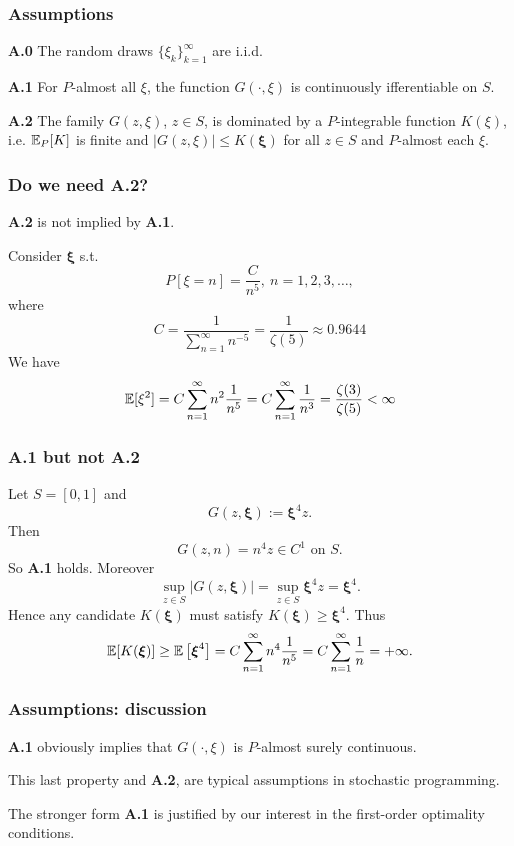 \documentclass{beamer}
\def\bxi{\boldsymbol\xi}
\begin{document}
\begin{frame}
\frametitle{Assumptions}

\noindent
\textbf{A.0}
The random draws $\lbrace \xi_k \rbrace_{k= 1}^{\infty}$ are i.i.d.

\mbox{}

\noindent
\textbf{A.1}
For $P$-almost all $\xi$, the function $G(\cdot, \xi)$ is continuously ifferentiable on $S$.

\mbox{}

\noindent
\textbf{A.2}
The family $G(z, \xi)$, $z \in S$, is dominated by a $P$-integrable function $K(\xi)$, i.e. ${\mathbb{E}}_P[K]$ is finite and $| G(z, \xi) | \leq K(\bxi)$ for all $z \in S$ and $P$-almost each $\xi$.

\end{frame}

\begin{frame}
\frametitle{Do we need {\bf A.2}?}

{\bf A.2} is not implied by {\bf A.1}.

\mbox{}

Consider $\bxi$ s.t.
$$
P[\xi = n] = \frac{C}{n^5},\ n = 1, 2, 3,\ldots,
$$
where
$$
C = \frac{1}{\sum_{n = 1}^{\infty} n^{-5}} = \frac{1}{\zeta(5)} \approx 0.9644
$$
We have
$$
{\mathbb{E}}[\xi^2] = C \sum_{n = 1}^{\infty} n^2\frac{1}{n^5} = C \sum_{n = 1}^{\infty}\frac{1}{n^3} = \frac{\zeta(3)}{\zeta(5)} < \infty
$$

\end{frame}

\begin{frame}
\frametitle{{\bf A.1} but not {\bf A.2}}

Let $S=[0,1]$ and
$$
G(z,\bxi) := \bxi^4 z.
$$
Then
$$
G(z,n) = n^4 z \in C^1 \text{ on } S.
$$
So {\bf A.1} holds. Moreover
$$
\sup_{z \in S} | G(z,\bxi) | = \sup_{z \in S} \bxi^4 z = \bxi^4.
$$
Hence any candidate $K(\bxi)$ must satisfy $K(\bxi) \geq \bxi^4$. Thus
$$
\EE [K(\bxi)] \geq \EE \left[ \bxi^4 \right] = C \sum_{n = 1}^{\infty} n^4\frac{1}{n^5} = C \sum_{n = 1}^{\infty}\frac{1}{n} = +\infty.
$$

\end{frame}

\begin{frame}
\frametitle{Assumptions: discussion}

\textbf{A.1} obviously implies that $G(\cdot, \xi)$ is $P$-almost surely continuous.

\mbox{}

This last property and \textbf{A.2}, are typical assumptions in stochastic programming.
\mbox{}

The stronger form \textbf{A.1} is justified by our interest in the first-order optimality conditions.%

\end{frame}
\end{document}
